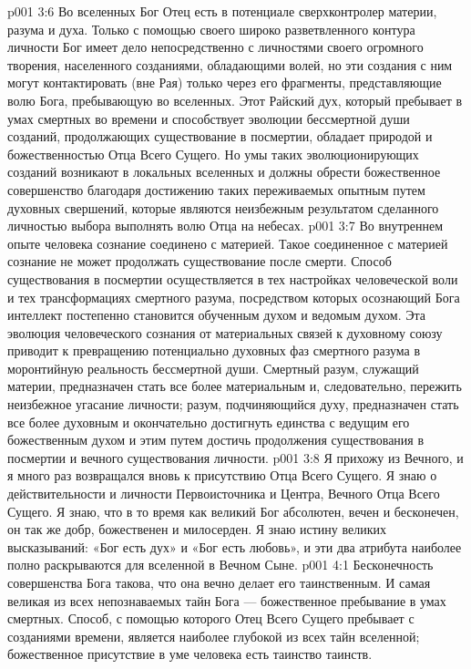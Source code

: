 \vs p001 3:6 \pc Во вселенных Бог Отец есть в потенциале сверхконтролер материи, разума и духа. Только с помощью своего широко разветвленного контура личности Бог имеет дело непосредственно с личностями своего огромного творения, населенного созданиями, обладающими волей, но эти создания с ним могут контактировать (вне Рая) только через его фрагменты, представляющие волю Бога, пребывающую во вселенных. Этот Райский дух, который пребывает в умах смертных во времени и способствует эволюции бессмертной души созданий, продолжающих существование в посмертии, обладает природой и божественностью Отца Всего Сущего. Но умы таких эволюционирующих созданий возникают в локальных вселенных и должны обрести божественное совершенство благодаря достижению таких переживаемых опытным путем духовных свершений, которые являются неизбежным результатом сделанного личностью выбора выполнять волю Отца на небесах.
\vs p001 3:7 \pc Во внутреннем опыте человека сознание соединено с материей. Такое соединенное с материей сознание не может продолжать существование после смерти. Способ существования в посмертии осуществляется в тех настройках человеческой воли и тех трансформациях смертного разума, посредством которых осознающий Бога интеллект постепенно становится обученным духом и ведомым духом. Эта эволюция человеческого сознания от материальных связей к духовному союзу приводит к превращению потенциально духовных фаз смертного разума в моронтийную реальность бессмертной души. Смертный разум, служащий материи, предназначен стать все более материальным и, следовательно, пережить неизбежное угасание личности; разум, подчиняющийся духу, предназначен стать все более духовным и окончательно достигнуть единства с ведущим его божественным духом и этим путем достичь продолжения существования в посмертии и вечного существования личности.
\vs p001 3:8 Я прихожу из Вечного, и я много раз возвращался вновь к присутствию Отца Всего Сущего. Я знаю о действительности и личности Первоисточника и Центра, Вечного Отца Всего Сущего. Я знаю, что в то время как великий Бог абсолютен, вечен и бесконечен, он так же добр, божественен и милосерден. Я знаю истину великих высказываний: «Бог есть дух» и «Бог есть любовь», и эти два атрибута наиболее полно раскрываются для вселенной в Вечном Сыне.
\vs p001 4:1 Бесконечность совершенства Бога такова, что она вечно делает его таинственным. И самая великая из всех непознаваемых тайн Бога --- божественное пребывание в умах смертных. Способ, с помощью которого Отец Всего Сущего пребывает с созданиями времени, является наиболее глубокой из всех тайн вселенной; божественное присутствие в уме человека есть таинство таинств.
